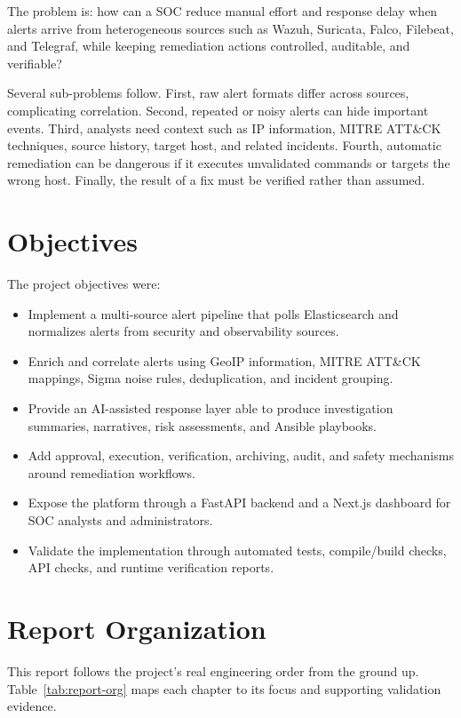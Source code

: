 The problem is: how can a SOC reduce manual effort and response delay when alerts arrive from heterogeneous sources such as Wazuh, Suricata, Falco, Filebeat, and Telegraf, while keeping remediation actions controlled, auditable, and verifiable?

Several sub-problems follow. First, raw alert formats differ across sources, complicating correlation. Second, repeated or noisy alerts can hide important events. Third, analysts need context such as IP information, MITRE ATT\&CK techniques, source history, target host, and related incidents. Fourth, automatic remediation can be dangerous if it executes unvalidated commands or targets the wrong host. Finally, the result of a fix must be verified rather than assumed.

\section*{Objectives}

The project objectives were:

\begin{itemize}[leftmargin=1cm]
\item Implement a multi-source alert pipeline that polls Elasticsearch and normalizes alerts from security and observability sources.
\item Enrich and correlate alerts using GeoIP information, MITRE ATT\&CK mappings, Sigma noise rules, deduplication, and incident grouping.
\item Provide an AI-assisted response layer able to produce investigation summaries, narratives, risk assessments, and Ansible playbooks.
\item Add approval, execution, verification, archiving, audit, and safety mechanisms around remediation workflows.
\item Expose the platform through a FastAPI backend and a Next.js dashboard for SOC analysts and administrators.
\item Validate the implementation through automated tests, compile/build checks, API checks, and runtime verification reports.
\end{itemize}

\section*{Report Organization}

This report follows the project's real engineering order from the ground up. Table~\ref{tab:report-org} maps each chapter to its focus and supporting validation evidence.

